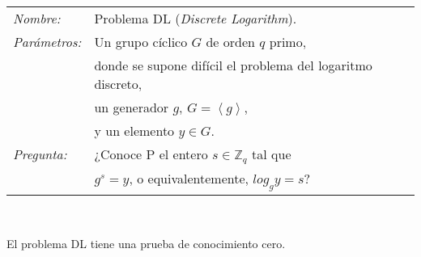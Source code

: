 \begin{tabular}{|ll}
	\textit{Nombre:} & Problema DL (\textit{Discrete Logarithm}). \\
	\textit{Parámetros:} & Un grupo cíclico $G$ de orden $q$ primo, \\ & donde se supone difícil el problema del logaritmo discreto,  \\ & un generador $g$, $G=\left\langle g \right\rangle$,\\ & y un elemento $y\in G$. \\
	\textit{Pregunta:} & ¿Conoce P el entero $s\in \mathbb{Z}_q$ tal que \\ & $g^s = y$, o equivalentemente, $log_g y = s$? \\
\end{tabular}
\\

\hfil


\begin{theorem}
	El problema DL tiene una prueba de conocimiento cero.
\end{theorem}


